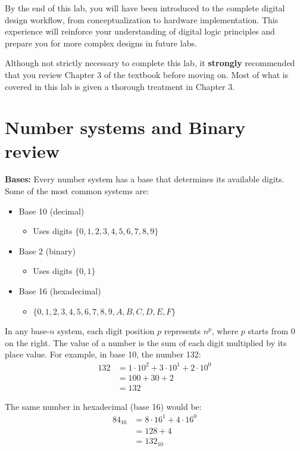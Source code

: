 \documentclass[12pt]{betterjournal}
\begin{document}
By the end of this lab, you will have been introduced to the complete digital design workflow, from conceptualization to hardware implementation. This experience will reinforce your understanding of digital logic principles and prepare you for more complex designs in future labs.

\clearpage

\begin{extra}[frametitle={Textbook Reading}]
    Although not strictly necessary to complete this lab, it \textbf{strongly} recommended that you review Chapter 3 of the textbook before moving on. Most of what is covered in this lab is given a thorough treatment in Chapter 3.
\end{extra}
\section{Number systems and Binary review}
\noindent\textbf{Bases:}\hfill\break
Every number system has a base that determines its available digits. Some of the most common systems are:
\begin{itemize}
    \item Base 10 (decimal)
    \begin{itemize}
        \item Uses digits $\{0,1,2,3,4,5,6,7,8,9\}$
    \end{itemize}
    \item Base 2 (binary) 
    \begin{itemize}
        \item Uses digits $\{0,1\}$
    \end{itemize}
    \item Base 16 (hexadecimal)
    \begin{itemize}
        \item $\{0,1,2,3,4,5,6,7,8,9,A,B,C,D,E,F\}$
    \end{itemize}
\end{itemize}

In any base-$n$ system, each digit position $p$ represents $n^p$, where $p$ starts from 0 on the right. The value of a number is the sum of each digit multiplied by its place value.
For example, in base 10, the number 132:
\begin{align*}    
132 &= 1 \cdot 10^2 + 3 \cdot 10^1 + 2 \cdot 10^0
\\&= 100 + 30 + 2
\\&= 132
\end{align*}

The same number in hexadecimal (base 16) would be:
\begin{align*}    
84_{16} &= 8 \cdot 16^1 + 4 \cdot 16^0 \\
&= 128 + 4 \\
&= 132_{10}
\end{align*}
\end{document}
